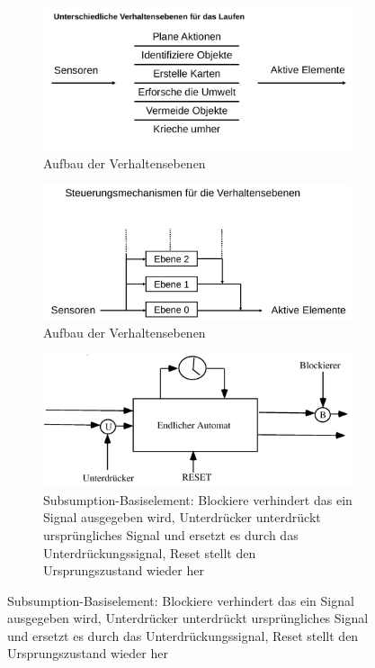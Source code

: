\begin{figure}[h!]
	\begin{subfigure}{.5\textwidth}
		\centering
		\includegraphics[width=\textwidth]{figures/aufbau_verhaltensebenen.png}
		\caption{Aufbau der Verhaltensebenen}
	\end{subfigure}
	\begin{subfigure}{.5\textwidth}
		\centering
		\includegraphics[width=\textwidth]{figures/aufbau_verhaltensebenen_1.png}
		\caption{Aufbau der Verhaltensebenen}
	\end{subfigure}\par\medskip
	\begin{subfigure}{.5\textwidth}
		\centering
		\includegraphics[width=\textwidth]{figures/subsumption_basiselement.png}
		\caption{Subsumption-Basiselement: Blockiere verhindert das ein Signal ausgegeben wird, Unterdrücker unterdrückt ursprüngliches Signal und ersetzt es durch das Unterdrückungssignal, Reset stellt den Ursprungszustand wieder her}

\end{subfigure}
\end{figure}
